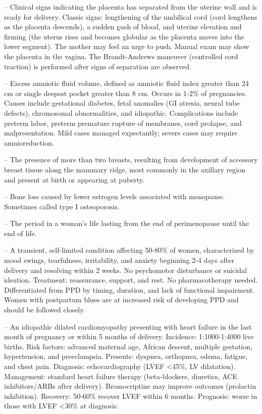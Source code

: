 -- Clinical signs indicating the placenta has separated from the uterine wall and is ready for delivery. Classic signs: lengthening of the umbilical cord (cord lengthens as the placenta descends), a sudden gush of blood, and uterine elevation and firming (the uterus rises and becomes globular as the placenta moves into the lower segment). The mother may feel an urge to push. Manual exam may show the placenta in the vagina. The Brandt-Andrews maneuver (controlled cord traction) is performed after signs of separation are observed.

-- Excess amniotic fluid volume, defined as amniotic fluid index greater than 24 cm or single deepest pocket greater than 8 cm. Occurs in 1-2\% of pregnancies. Causes include gestational diabetes, fetal anomalies (GI atresia, neural tube defects), chromosomal abnormalities, and idiopathic. Complications include preterm labor, preterm premature rupture of membranes, cord prolapse, and malpresentation. Mild cases managed expectantly; severe cases may require amnioreduction.

-- The presence of more than two breasts, resulting from development of accessory breast tissue along the mammary ridge, most commonly in the axillary region and present at birth or appearing at puberty.

-- Bone loss caused by lower estrogen levels associated with menopause. Sometimes called type I osteoporosis.

-- The period in a woman’s life lasting from the end of perimenopause until the end of life.

-- A transient, self-limited condition affecting 50-80\% of women, characterized by mood swings, tearfulness, irritability, and anxiety beginning 2-4 days after delivery and resolving within 2 weeks. No psychomotor disturbance or suicidal ideation. Treatment: reassurance, support, and rest. No pharmacotherapy needed. Differentiated from PPD by timing, duration, and lack of functional impairment. Women with postpartum blues are at increased risk of developing PPD and should be followed closely.

-- An idiopathic dilated cardiomyopathy presenting with heart failure in the last month of pregnancy or within 5 months of delivery. Incidence: 1:1000-1:4000 live births. Risk factors: advanced maternal age, African descent, multiple gestation, hypertension, and preeclampsia. Presents: dyspnea, orthopnea, edema, fatigue, and chest pain. Diagnosis: echocardiography (LVEF <45\%, LV dilatation). Management: standard heart failure therapy (beta-blockers, diuretics, ACE inhibitors/ARBs after delivery). Bromocriptine may improve outcomes (prolactin inhibition). Recovery: 50-60\% recover LVEF within 6 months. Prognosis: worse in those with LVEF <30\% at diagnosis.

